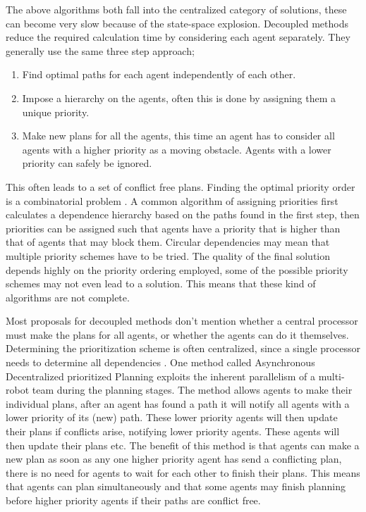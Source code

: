 The above algorithms both fall into the centralized category of solutions, these
can become very slow because of the state-space explosion. Decoupled methods
reduce the required calculation time by considering each agent separately. They
generally use the same three step approach;
\begin{enumerate}
    \item Find optimal paths for each agent independently of each other.
    \item Impose a hierarchy on the agents, often this is done by assigning
    them a unique priority.
    \item Make new plans for all the agents, this time an agent has to consider
    all agents with a higher priority as a moving obstacle. Agents with a lower
    priority can safely be ignored.
\end{enumerate}
This often leads to a set of conflict free plans. Finding the optimal priority
order is a combinatorial problem \cite{bennewitz2002}. A common algorithm of
assigning priorities first calculates a dependence hierarchy based on the paths
found in the first step, then priorities can be assigned such that agents have
a priority that is higher than that of agents that may block them. Circular
dependencies may mean that multiple priority schemes have to be tried. The
quality of the final solution depends highly on the priority ordering employed,
some of the possible priority schemes may not even lead to a solution. This
means that these kind of algorithms are not complete.

Most proposals for decoupled methods don't mention whether a central processor
must make the plans for all agents, or whether the agents can do it themselves.
Determining the prioritization scheme is often centralized, since a
single processor needs to determine all dependencies \cite{bennewitz2002}. One
method called Asynchronous Decentralized prioritized Planning \cite{cap2012}
exploits the inherent parallelism of a multi-robot team during the planning
stages. The method allows
agents to make their individual plans, after an agent has found a path it will
notify all agents with a lower priority of its (new) path. These lower priority
agents will then update their plans if conflicts arise, notifying lower
priority agents. These agents will then update their plans etc. The benefit of
this method is that agents can make a new plan as soon as any one higher
priority agent has send a conflicting plan, there is no need for agents to
wait for each other to finish their plans. This means that agents can plan
simultaneously and that some agents may finish planning before higher priority
agents if their paths are conflict free.

